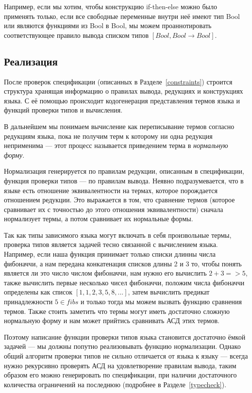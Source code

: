 Например, если мы хотим, чтобы конструкцию if-then-else можно было применять только, если все свободные переменные внутри неё имеют тип Bool или являются функциями из Bool в Bool, мы можем проаннотировать соответствующее правило вывода списком типов $[Bool, Bool\rightarrow Bool]$.

\subsection*{Реализация}

После проверок спецификации (описанных в Разделе~\ref{constraints}) строится структура хранящая информацию о правилах вывода, редукциях и конструкциях языка. С её помощью происходит кодогенерация представления термов языка и функций проверки типов и вычисления.

В дальнейшем мы понимаем вычисление как переписывание термов согласно редукциям языка, пока не получим терм к которому ни одна редукция неприменима --- этот процесс называется приведением терма в \textit{нормальную форму}.

Нормализация генерируется по правилам редукции, описанным в спецификации, функция проверки типов --- по правилам вывода. Неявно подразумевается, что в языке есть отношение эквивалентности на термах, которое порождается отношением редукции. Это выражается в том, что сравнение термов (которое сравнивает их с точностью до этого отношения эквивалентности) сначала нормализует термы, а потом сравнивает их нормальные формы.

Так как типы зависимого языка могут включать в себя произвольные термы, проверка типов является задачей тесно связанной с вычислением языка. Например, если наша функция принимает только списки длинны числа фибоначчи, а нам передана конкатенация списков длины 2 и 3 то, чтобы понять является ли это число числом фибоначчи, нам нужно его вычислить $2 + 3 => 5$, также вычислить первые несколько чисел фибоначчи, положим числа фибоначчи определены как список $[1,1,2,3,5,8,...]$, затем вычислить предикат принадлежности $5 \in fibs$ и только тогда мы можем вызвать функцию сравнения термов. Также стоить заметить что термы могут иметь достаточно сложную нормальную форму и нам может прийтись сравнивать АСД этих термов.

Поэтому написание функции проверки типов языка становится достаточно ёмкой задачей --- мы должны попутно реализовывать функцию нормализации. Однако общий алгоритм проверки типов не сильно отличается от языка к языку --- всегда нужно рекурсивно проверять АСД на удовлетворение правилам вывода, таким образом его можно генерировать по спецификации, при наличии достаточного количества ограничений на последнюю (подробнее в Разделе~\ref{typecheck}).


